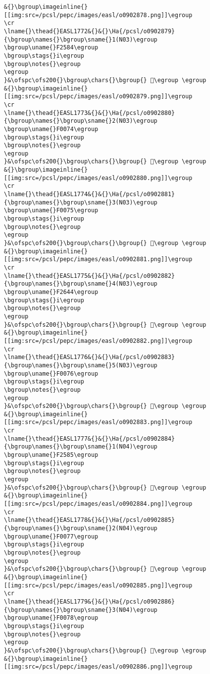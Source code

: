 \begin{verbatim}
&{}\bgroup\imageinline{}[[img:src=/pcsl/pepc/images/easl/o0902878.png]]\egroup
\cr
\lname{}\thead{}EASL1772&{}&{}\Ha{/pcsl/o0902879}{\bgroup\names{}\bgroup\sname{}1(N03)\egroup
\bgroup\uname{}F2584\egroup
\bgroup\stags{}i\egroup
\bgroup\notes{}\egroup
\egroup
}&\ofspc\ofs200{}\bgroup\chars{}\bgroup{} 󲖄\egroup \egroup
&{}\bgroup\imageinline{}[[img:src=/pcsl/pepc/images/easl/o0902879.png]]\egroup
\cr
\lname{}\thead{}EASL1773&{}&{}\Ha{/pcsl/o0902880}{\bgroup\names{}\bgroup\sname{}2(N03)\egroup
\bgroup\uname{}F0074\egroup
\bgroup\stags{}i\egroup
\bgroup\notes{}\egroup
\egroup
}&\ofspc\ofs200{}\bgroup\chars{}\bgroup{} 󰁴\egroup \egroup
&{}\bgroup\imageinline{}[[img:src=/pcsl/pepc/images/easl/o0902880.png]]\egroup
\cr
\lname{}\thead{}EASL1774&{}&{}\Ha{/pcsl/o0902881}{\bgroup\names{}\bgroup\sname{}3(N03)\egroup
\bgroup\uname{}F0075\egroup
\bgroup\stags{}i\egroup
\bgroup\notes{}\egroup
\egroup
}&\ofspc\ofs200{}\bgroup\chars{}\bgroup{} 󰁵\egroup \egroup
&{}\bgroup\imageinline{}[[img:src=/pcsl/pepc/images/easl/o0902881.png]]\egroup
\cr
\lname{}\thead{}EASL1775&{}&{}\Ha{/pcsl/o0902882}{\bgroup\names{}\bgroup\sname{}4(N03)\egroup
\bgroup\uname{}F2644\egroup
\bgroup\stags{}i\egroup
\bgroup\notes{}\egroup
\egroup
}&\ofspc\ofs200{}\bgroup\chars{}\bgroup{} 󲙄\egroup \egroup
&{}\bgroup\imageinline{}[[img:src=/pcsl/pepc/images/easl/o0902882.png]]\egroup
\cr
\lname{}\thead{}EASL1776&{}&{}\Ha{/pcsl/o0902883}{\bgroup\names{}\bgroup\sname{}5(N03)\egroup
\bgroup\uname{}F0076\egroup
\bgroup\stags{}i\egroup
\bgroup\notes{}\egroup
\egroup
}&\ofspc\ofs200{}\bgroup\chars{}\bgroup{} 󰁶\egroup \egroup
&{}\bgroup\imageinline{}[[img:src=/pcsl/pepc/images/easl/o0902883.png]]\egroup
\cr
\lname{}\thead{}EASL1777&{}&{}\Ha{/pcsl/o0902884}{\bgroup\names{}\bgroup\sname{}1(N04)\egroup
\bgroup\uname{}F2585\egroup
\bgroup\stags{}i\egroup
\bgroup\notes{}\egroup
\egroup
}&\ofspc\ofs200{}\bgroup\chars{}\bgroup{} 󲖅\egroup \egroup
&{}\bgroup\imageinline{}[[img:src=/pcsl/pepc/images/easl/o0902884.png]]\egroup
\cr
\lname{}\thead{}EASL1778&{}&{}\Ha{/pcsl/o0902885}{\bgroup\names{}\bgroup\sname{}2(N04)\egroup
\bgroup\uname{}F0077\egroup
\bgroup\stags{}i\egroup
\bgroup\notes{}\egroup
\egroup
}&\ofspc\ofs200{}\bgroup\chars{}\bgroup{} 󰁷\egroup \egroup
&{}\bgroup\imageinline{}[[img:src=/pcsl/pepc/images/easl/o0902885.png]]\egroup
\cr
\lname{}\thead{}EASL1779&{}&{}\Ha{/pcsl/o0902886}{\bgroup\names{}\bgroup\sname{}3(N04)\egroup
\bgroup\uname{}F0078\egroup
\bgroup\stags{}i\egroup
\bgroup\notes{}\egroup
\egroup
}&\ofspc\ofs200{}\bgroup\chars{}\bgroup{} 󰁸\egroup \egroup
&{}\bgroup\imageinline{}[[img:src=/pcsl/pepc/images/easl/o0902886.png]]\egroup

\end{verbatim}
